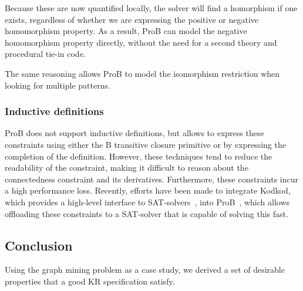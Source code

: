 Because these are now quantified locally, the solver will find a homorphism if one exists, regardless of whether we are expressing the positive or negative homomorphism property.
As a result, ProB can model the negative homomorphism property directly, without the need for a second theory and procedural tie-in code.

The same reasoning allows ProB to model the isomorphism restriction when looking for multiple patterns.
\subsubsection{Inductive definitions}
ProB does not support inductive definitions, but allows to express these constraints using either the B transitive closure primitive or by expressing the completion of the definition.
However, these techniques tend to reduce the readability of the constraint, making it difficult to reason about the connectedness constraint and its derivatives.
Furthermore, these constraints incur a high performance loss.
Recently, efforts have been made to integrate Kodkod, which provides a high-level interface to SAT-solvers~\citep{DBLP:conf/tacas/TorlakJ07}, into ProB~\citep{DBLP:conf/fm/PlaggeL12}, which allows offloading these constraints to a SAT-solver that is capable of solving this fast.


\subsection{Conclusion}

Using the graph mining problem as a case study, we derived a set of desirable properties that a good KR specification satisfy.

